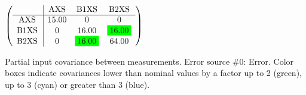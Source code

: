 \begin{table}[H]
\scriptsize
\begin{center}
\renewcommand{\arraystretch}{1.1}
\begin{math}\left(\begin{array}{c|ccc}
 & \mathrm{AXS} & 
\mathrm{B1XS} & 
\mathrm{B2XS} \\
\hline
\mathrm{AXS} \hspace*{2pt} &      15.00 &  0 &  0 \\
\mathrm{B1XS} \hspace*{2pt} &  0 &      16.00 &  \colorbox{Green1}{$     16.00$} \\
\mathrm{B2XS} \hspace*{2pt} &  0 &  \colorbox{Green1}{$     16.00$} &      64.00 \\
\end{array}\right)\end{math}
\caption{Partial input covariance between measurements. Error source \#0: Error. Color boxes indicate covariances lower than nominal values by a factor up to 2 (green), up to 3 (cyan) or greater than 3 (blue).}
\renewcommand{\arraystretch}{1}
\end{center}
\end{table}
\clearpage

